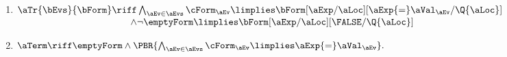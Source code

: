 \begin{definition}
\begin{multicols}{2}
\begin{enumerate}[topsep=0pt,label=(\textsc{w}\arabic*),ref=\textsc{w}\arabic*]
    
  \item \label{write-tau-ca}
    \begin{math}
      \begin{aligned}[t]
        \aTr{\bEvs}{\bForm} \riff
        &\textstyle\bigwedge_{\aEv\in\aEvs}
        \cForm_\aEv
        \limplies 
        \bForm[\aExp/\aLoc][\aExp{=}\aVal_\aEv/\Q{\aLoc}]
        \\[-.5ex]
        \land
        &
        \lnot \emptyForm
        \limplies 
        \bForm[\aExp/\aLoc][\FALSE/\Q{\aLoc}]
      \end{aligned}
    \end{math}
  \item \label{write-term-ca}
    \begin{math}
      \aTerm \riff
      \emptyForm
      \land
      \PBR{\bigwedge_{\aEv\in\aEvs}\cForm_\aEv \limplies \aExp{=}\aVal_\aEv}.
    \end{math}
  \end{enumerate}
  \end{multicols}


\end{definition}
